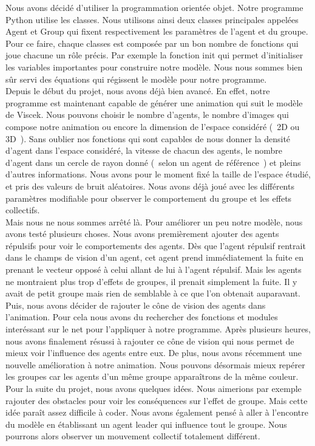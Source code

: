 \documentclass[french, a4paper, 12pt]{article}
\begin{document}
     Nous avons décidé d'utiliser la programmation orientée objet. Notre programme Python utilise les classes. Nous utilisons ainsi deux classes principales appelées Agent et Group qui fixent respectivement les paramètres de l'agent et du groupe. Pour ce faire, chaque classes est composée par un bon nombre de fonctions qui joue chacune un rôle précis. Par exemple la fonction init qui permet d'initialiser les variables importantes pour construire notre modèle. Nous nous sommes bien sûr servi des équations qui régissent le modèle pour notre programme. \\ 

     Depuis le début du projet, nous avons déjà bien avancé. En effet, notre programme est maintenant capable de générer une animation qui suit le modèle de Viscek. Nous pouvons choisir le nombre d'agents, le nombre d'images qui compose notre animation ou encore la dimension de l'espace considéré (~2D ou 3D~). Sans oublier nos fonctions qui sont capables de nous donner la densité d'agent dans l'espace considéré, la vitesse de chacun des agents, le nombre d'agent dans un cercle de rayon donné (~selon un agent de référence~) et pleins d'autres informations. Nous avons pour le moment fixé la taille de l'espace étudié, et pris des valeurs de bruit aléatoires. Nous avons déjà joué avec les différents paramètres modifiable pour observer le comportement du groupe et les effets collectifs. \\
     
     Mais nous ne nous sommes arrêté là. Pour améliorer un peu notre modèle, nous avons testé plusieurs choses. Nous avons premièrement ajouter des agents répulsifs pour voir le comportements des agents. Dès que l'agent répulsif rentrait dans le champs de vision d'un agent, cet agent prend immédiatement la fuite en prenant le vecteur opposé à celui allant de lui à l'agent répulsif. Mais les agents ne montraient plus trop d'effets de groupes, il prenait simplement la fuite. Il y avait de petit groupe mais rien de semblable à ce que l'on obtenait auparavant.\\
     
     Puis, nous avons décider de rajouter le cône de vision des agents dans l'animation. Pour cela nous avons du rechercher des fonctions et modules interéssant sur le net pour l'appliquer à notre programme. Après plusieurs heures, nous avons finalement résussi à rajouter ce cône de vision qui nous permet de mieux voir l'influence des agents entre eux. De plus, nous avons récemment une nouvelle amélioration à notre animation. Nous pouvons désormais mieux repérer les groupes car les agents d'un même groupe apparaîtrons de la même couleur.\\
     
     Pour la suite du projet, nous avons quelques idées. Nous aimerions par exemple rajouter des obstacles pour voir les conséquences sur l'effet de groupe. Mais cette idée paraît assez difficile à coder. Nous avons également pensé à aller à l'encontre du modèle en établissant un agent leader qui influence tout le groupe. Nous pourrons alors observer un mouvement collectif totalement différent.
     
     
     
       
\end{document}
